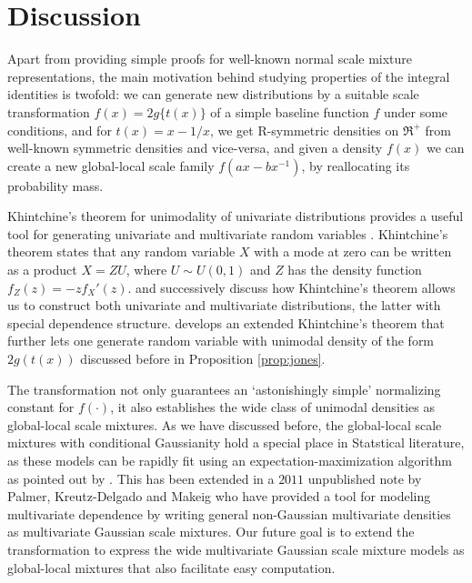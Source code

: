 \documentclass[letterpaper,11pt]{article}
\begin{document}
\section{Discussion}

Apart from providing simple proofs for well-known normal scale mixture representations, the main motivation behind studying properties of the integral identities is twofold: we can generate new distributions by a suitable scale transformation $f(x) = 2g\{ t(x) \}$ of a simple baseline function $f$ under some conditions, and for $t(x) = x - 1/x$, we get R-symmetric densities on $\Re^+$ from well-known symmetric densities and vice-versa, and given a density $f(x)$ we can create a new global-local scale family $f(ax-bx^{-1})$, by reallocating its probability mass. 

Khintchine's theorem for unimodality of univariate distributions provides a useful tool for generating univariate and multivariate random variables \citep{bryson1982constructing}. Khintchine's theorem states that any random variable $X$ with a mode at zero can be written as a product $X = ZU$, where $U \sim U(0,1)$ and $Z$ has the density function $f_Z(z) = -zf_{X}'(z)$. \citep{bryson1982constructing} and successively \cite{jones2010distributions,jones2012khintchine} discuss how Khintchine's theorem allows us to construct both univariate and multivariate distributions, the latter with special dependence structure. \cite{jones2014generating} develops an extended Khintchine's theorem that further lets one generate random variable with unimodal density of the form $2g(t(x))$ discussed before in Proposition \ref{prop:jones}. 

The \CS transformation not only guarantees an `astonishingly simple' normalizing constant for $f(\cdot)$, it also establishes the wide class of unimodal densities as global-local scale mixtures. As we have discussed before, the global-local scale mixtures with conditional Gaussianity hold a special place in Statstical literature, as these models can be rapidly fit using an expectation-maximization algorithm as pointed out by \cite{polson2013data}. This has been extended in a $2011$ unpublished note by Palmer, Kreutz-Delgado and Makeig who have provided a tool for modeling multivariate dependence by writing general non-Gaussian multivariate densities as multivariate Gaussian scale mixtures. Our future goal is to extend the \CS transformation to express the wide multivariate Gaussian scale mixture models as global-local mixtures that also facilitate easy computation. \par
\end{document}
